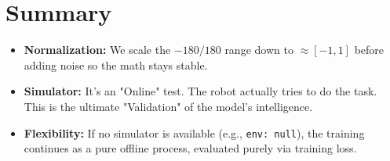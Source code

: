 \documentclass[11pt,a4paper]{article}
\begin{document}
\section{Summary}
\begin{itemize}
    \item \textbf{Normalization:} We scale the $-180/180$ range down to $\approx [-1, 1]$ before adding noise so the math stays stable.
    \item \textbf{Simulator:} It's an "Online" test. The robot actually tries to do the task. This is the ultimate "Validation" of the model's intelligence.
    \item \textbf{Flexibility:} If no simulator is available (e.g., \texttt{env: null}), the training continues as a pure offline process, evaluated purely via training loss.
\end{itemize}
\end{document}
